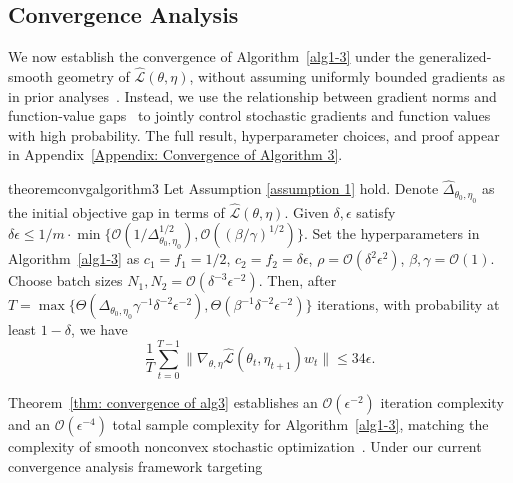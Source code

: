 \documentclass[twoside]{article} %
\def\eqref#1{equation~\ref{#1}}
\theoremstyle{plain}
\theoremstyle{definition}
\theoremstyle{remark}
\newcommand{\fhL}{\hat{\mathcal{L}}}
\begin{document}
\subsection{Convergence Analysis}
We now establish the convergence of Algorithm~\ref{alg1-3} under the generalized-smooth geometry of \(\fhL(\theta,\eta)\), without assuming uniformly bounded gradients as in prior analyses~\citep{MODO,MOCO,SDMkaiyiJi}. Instead, we use the relationship between gradient norms and function-value gaps~\citep{Haochuangensmooth} to jointly control stochastic gradients and function values with high probability. The full result, hyperparameter choices, and proof appear in Appendix~\ref{Appendix: Convergence of Algorithm 3}.
\begin{restatable}{theorem}{convgalgorithm3}\label{thm: convergence of alg3}
     Let Assumption \ref{assumption 1} hold. Denote
    $\hat{\Delta}_{\theta_0,\eta_0}$ as the initial objective gap in terms of $\fhL(\theta,\eta)$. Given $\delta,\epsilon$ satisfy $\delta\epsilon\leq 1/m\cdot\min\{\mathcal{O}({1}/{\Delta_{\theta_0,\eta_0}^{1/2}}),\mathcal{O}((\beta/\gamma)^{1/2})\}$. Set the hyperparameters in Algorithm~\ref{alg1-3} as $c_1=f_1={1}/{2}$, $c_2=f_2=\delta\epsilon$, 
    $\rho=\mathcal{O}(\delta^2\epsilon^2)$, $\beta,\gamma = \mathcal{O}(1)$. Choose batch sizes $N_1,N_2=\mathcal{O}(\delta^{-3}\epsilon^{-2})$. Then, after
    $T
    =\max\{ \Theta(\Delta_{\theta_0,\eta_0}\gamma^{-1}\delta^{-2}\epsilon^{-2}),\Theta(\beta^{-1}\delta^{-2}\epsilon^{-2})\}$ iterations, with probability at least $1-\delta$, we have 
    \[\frac{1}{T}\sum_{t=0}^{T-1}\|\nabla_{\theta,\eta}\fhL(\theta_t, \eta_{t+1})w_t\|\leq 34\epsilon.\]
    \vspace{-1.5em}
\end{restatable}
Theorem~\ref{thm: convergence of alg3} establishes an \(\mathcal{O}(\epsilon^{-2})\) iteration complexity and an \(\mathcal{O}(\epsilon^{-4})\) total sample complexity for Algorithm~\ref{alg1-3}, matching the complexity of smooth nonconvex stochastic optimization~\citep{lowerbound}. Under our current convergence analysis framework targeting
\end{document}
